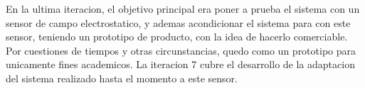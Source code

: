 En la ultima iteracion, el objetivo principal era poner a prueba el sistema con un sensor de campo electrostatico, y ademas acondicionar el sistema para con este sensor, teniendo un prototipo de producto, con la idea de hacerlo comerciable. Por cuestiones de tiempos y otras circunstancias, quedo como un prototipo para unicamente fines academicos. La iteracion 7 cubre el desarrollo de la adaptacion del sistema realizado hasta el momento a este sensor. \\










